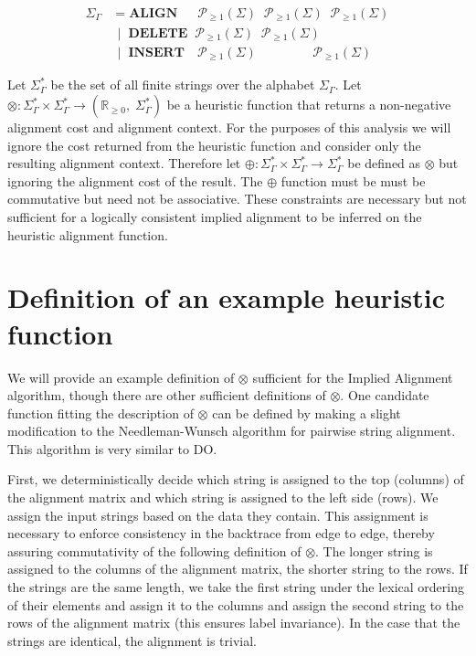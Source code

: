 \documentclass[11pt]{article}
\newcommand*\NEPowerset{\mathcal{P}_{\geq 1}}
\newcommand*\NonNegReals{\mathbb{R}_{\geq 0}}
\begin{document}
\begin{align*}
  \Sigma_{\Gamma} &      = \textbf{ALIGN}  \;\;\;\;\;\,  \NEPowerset (\Sigma) \;\; \NEPowerset (\Sigma) \;\; \NEPowerset (\Sigma)
\\                & \;\, | \;\; \textbf{DELETE} \;\;     \NEPowerset (\Sigma) \;\; \NEPowerset (\Sigma)
\\                & \;\, | \;\; \textbf{INSERT} \;\;\;\, \NEPowerset (\Sigma) \;\; \quad\quad\quad\;         \;\; \NEPowerset (\Sigma)
\end{align*}

Let $\Sigma^{*}_{\Gamma}$ be the set of all finite strings over the alphabet $\Sigma_{\Gamma}$.
Let $\otimes : \Sigma^{*}_{\Gamma} \times \Sigma^{*}_{\Gamma} \rightarrow \left(\NonNegReals,\; \Sigma^{*}_{\Gamma}\right)$ be a heuristic function that returns a non-negative alignment cost and alignment context.
For the purposes of this analysis we will ignore the cost returned from the heuristic function and consider only the resulting alignment context.
Therefore let $\oplus : \Sigma^{*}_{\Gamma} \times \Sigma^{*}_{\Gamma} \rightarrow \Sigma^{*}_{\Gamma}$ be defined as $\otimes$ but ignoring the alignment cost of the result.
The $\oplus$ function must be must be commutative but need not be associative.
These constraints are necessary but not sufficient for a logically consistent implied alignment to be inferred on the heuristic alignment function.

\section{Definition of an example heuristic function}
We will provide an example definition of $\otimes$ sufficient for the Implied Alignment algorithm, though there are other sufficient definitions of $\otimes$.
One candidate function fitting the description of $\otimes$ can be defined by making a slight modification to the Needleman-Wunsch \citep{Needleman1970} algorithm for pairwise string alignment.
This algorithm is very similar to DO.

First, we deterministically decide which string is assigned to the top (columns) of the alignment matrix and which string is assigned to the left side (rows).
We assign the input strings based on the data they contain.
This assignment is necessary to enforce consistency in the backtrace from edge to edge, thereby assuring commutativity of the following definition of $\otimes$.
The longer string is assigned to the columns of the alignment matrix, the shorter string to the rows.
If the strings are the same length, we take the first string under the lexical ordering of their elements and assign it to the columns and assign the second string to the rows of the alignment matrix (this ensures label invariance). 
In the case that the strings are identical, the alignment is trivial.
\end{document}
